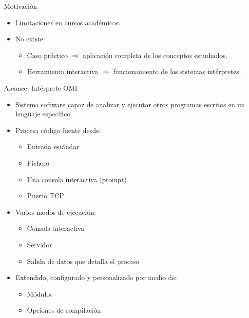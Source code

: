 \documentclass[spanish]{beamer}
\begin{document}
\begin{frame}{Motivación}
    \begin{itemize}
        \item Limitaciones en cursos académicos.
        \item No existe: 
        \begin {itemize}
            \item Caso práctico $\Rightarrow$ aplicación completa de los conceptos estudiados.
            \item Herramienta interactiva $\Rightarrow$ funcionamiento de los sistemas intérpretes.
        \end{itemize}
   \end{itemize}
\end{frame}

\begin{frame}{Alcance: Intérprete OMI}
    \begin{itemize}
        \item Sistema software capaz de analizar y ejecutar otros programas escritos en un lenguaje específico.
        \item Procesa código fuente desde: 
        \begin {itemize}
            \item Entrada estándar
            \item Fichero
            \item Una consola interactiva (prompt)
            \item Puerto TCP  
        \end{itemize}
        \item Varios modos de ejecución: 
        \begin {itemize}
            \item Consola interactiva
            \item Servidor
            \item Salida de datos que detalla el proceso
        \end{itemize}
         \item Extendido, configurado y personalizado por medio de:
         \begin {itemize}
            \item Módulos
            \item Opciones de compilación
        \end{itemize}
   \end{itemize}
\end{frame}
\end{document}

